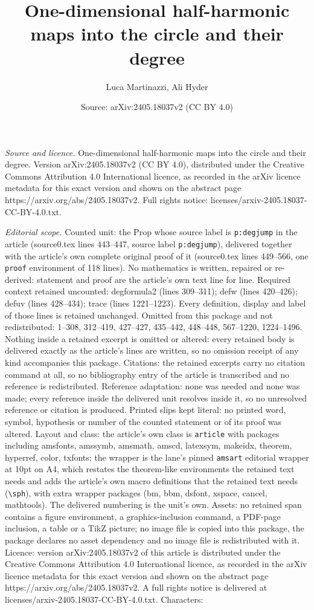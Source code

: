 \documentclass[10pt,a4paper]{amsart}
\title[One-dimensional half-harmonic maps into the circle and their]{One-dimensional half-harmonic maps into the circle and their degree}
\author{Luca Martinazzi, Ali Hyder}
\date{Source: arXiv:2405.18037v2 (CC BY 4.0)}
\begin{document}
\maketitle

\noindent\emph{Source and licence.} One-dimensional half-harmonic maps into the circle and their degree. Version arXiv:2405.18037v2 (CC BY 4.0), distributed under the Creative Commons Attribution 4.0 International licence, as recorded in the arXiv licence metadata for this exact version and shown on the abstract page https://arxiv.org/abs/2405.18037v2. Full rights notice: licenses/arxiv-2405.18037-CC-BY-4.0.txt.\par\smallskip

\noindent\textit{Editorial scope.} Counted unit: the Prop whose source label is \texttt{p:degjump} in the article (source0.tex lines 443--447, source label \texttt{p:degjump}), delivered together with the article's own complete original proof of it (source0.tex lines 449--566, one \texttt{proof} environment of 118 lines). No mathematics is written, repaired or re-derived: statement and proof are the article's own text line for line. Required context retained uncounted: degformula2 (lines 309--311); defw (lines 420--426); defuv (lines 428--434); trace (lines 1221--1223). Every definition, display and label of those lines is retained unchanged. Omitted from this package and not redistributed: 1--308, 312--419, 427--427, 435--442, 448--448, 567--1220, 1224--1496. Nothing inside a retained excerpt is omitted or altered: every retained body is delivered exactly as the article's lines are written, so no omission receipt of any kind accompanies this package. Citations: the retained excerpts carry no citation command at all, so no bibliography entry of the article is transcribed and no reference is redistributed. Reference adaptation: none was needed and none was made; every reference inside the delivered unit resolves inside it, so no unresolved reference or citation is produced. Printed slips kept literal: no printed word, symbol, hypothesis or number of the counted statement or of its proof was altered. Layout and class: the article's own class is \texttt{article} with packages including amsfonts, amssymb, amsmath, amscd, latexsym, makeidx, theorem, hyperref, color, txfonts; the wrapper is the lane's pinned \texttt{amsart} editorial wrapper at 10pt on A4, which restates the theorem-like environments the retained text needs and adds the article's own macro definitions that the retained text needs (\texttt{\textbackslash sph}), with extra wrapper packages (bm, bbm, dsfont, xspace, cancel, mathtools). The delivered numbering is the unit's own. Assets: no retained span contains a figure environment, a graphics-inclusion command, a PDF-page inclusion, a table or a TikZ picture; no image file is copied into this package, the package declares no asset dependency and no image file is redistributed with it. Licence: version arXiv:2405.18037v2 of this article is distributed under the Creative Commons Attribution 4.0 International licence, as recorded in the arXiv licence metadata for this exact version and shown on the abstract page https://arxiv.org/abs/2405.18037v2. A full rights notice is delivered at licenses/arxiv-2405.18037-CC-BY-4.0.txt. Characters: 
\end{document}
